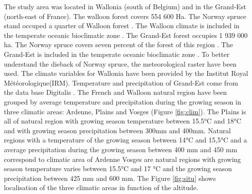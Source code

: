 \documentclass[3p,procedia]{elsarticle}
\begin{document}
The study area was located in Wallonia (south of Belgium) and in the Grand-Est (north-east of France).
The walloon forest covers 554 600 Ha. 
The Norway spruce stand occuped a quarter of Walloon forest \citep{Alderweireld_2015}. 
The Walloon climate is included in the temperate oceanic bioclimatic zone \citep{lindner_climate_2010}. 
The Grand-Est forest occupies 1 939 000 ha. 
The Norway spruce covers seven percent of the forest of this region  \citep{IGN2022}. 
The Grand-Est is included in the temperate oceanic bioclimatic zone \citep{lindner_climate_2010}.
To better understand the dieback of Norway spruce, the meteorological raster have been used. 
The climate variables for Wallonia have been provided by the Institut Royal Météorologique(IRM).
Temperature and precipitation of Grand-Est come from the data base Digitalis \citep{piedallu_presentation_2014}.
The French and Walloon natural region have been grouped by average temperature and precipitation during the growing season in three climatic areas: Ardenne, Plains and Vosges (Figure \ref{fig:clim}).
The Plains is all of natural region with growing season temperature between 15.5°C and 18°C and with growing season precipitation between 300mm and 400mm.
Natural regions with a temperature of the growing season between 14°C and 15,5°C and a average precipitation during the growing season between 400 mm and 450 mm correspond to climatic area of Ardenne
Vosges are natural regions with growing season temperature varies between 15.5°C and 17 °C and the growing season precipitation between 425 mm and 600 mm.
The Figure \ref{fig:situ} shows localisation of the three climatic areas in function of the altitude. 
\end{document}
